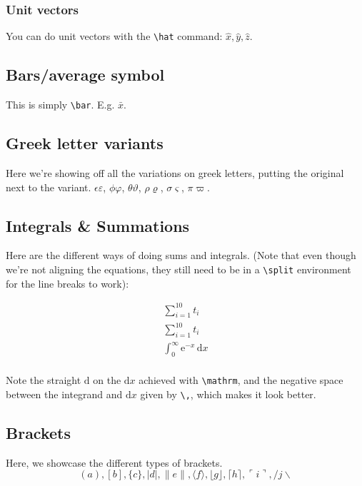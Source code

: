 \documentclass[../main]{subfiles}
\begin{document}
\subsubsection{Unit vectors} 
You can do unit vectors with the \verb|\hat| command: $\hat{x}, \hat{y}, \hat{z}$.

\subsection{Bars/average symbol}

This is simply \verb|\bar|. E.g. $\bar{x}$.

\subsection{Greek letter variants}
Here we're showing off all the variations on greek letters, putting the original next to the variant. $\epsilon \varepsilon$,  $\phi \varphi$, $\theta \vartheta$, $\rho \varrho$, $\sigma \varsigma$, $\pi \varpi$.

\subsection{Integrals \& Summations}
Here are the different ways of doing sums and integrals. (Note that even though we're not aligning the equations, they still need to be in a \verb|\split| environment for the line breaks to work):

\begin{equation*}
    \begin{split}
        \sum_{i=1}^{10} t_i \\
        \displaystyle\sum_{i=1}^{10} t_i \\
        \int_0^\infty \mathrm{e}^{-x}\,\mathrm{d}x\\
    \end{split}
\end{equation*}

Note the straight $\mathrm{d}$ on the $\mathrm{d}x$ achieved with \verb|\mathrm|, and the negative space between the integrand and $\mathrm{d}x$ given by \verb|\,|, which makes it look better.

\subsection{Brackets}
Here, we showcase the different types of brackets.
\begin{equation*}
    ( a ), [ b ], \{ c \}, | d |, \| e \|,
\langle f \rangle, \lfloor g \rfloor,
\lceil h \rceil, \ulcorner i \urcorner,
/ j \backslash
\end{equation*}
\end{document}
